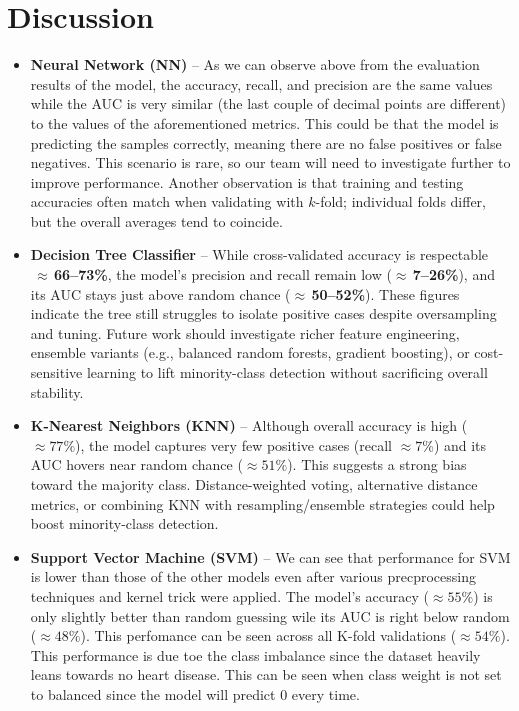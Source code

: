 \documentclass[11pt,a4paper]{article}
\begin{document}
\section{Discussion}
\begin{itemize}
    \item \textbf{Neural Network (NN)} – As we can observe above from the evaluation
          results of the model, the accuracy, recall,
          and precision are the same values while the AUC is very similar
          (the last couple of decimal points are different) to the values
          of the aforementioned metrics. This
          could be that the model is predicting the samples correctly, meaning
          there are no false positives or false negatives. This
          scenario is rare, so our team will need to investigate further to improve performance.
          Another observation is that training and testing accuracies often match when validating with \(k\)-fold;
          individual folds differ, but the overall averages tend to coincide.
    \item \textbf{Decision Tree Classifier} – While cross-validated accuracy is respectable
          $\,\approx$\,\textbf{66--73\%},
          the model’s precision and recall remain low ($\approx$\,\textbf{7--26\%}), and its AUC stays just above random chance
          ($\approx$\,\textbf{50--52\%}). These figures indicate the tree still struggles to isolate positive cases despite oversampling and tuning. Future work should investigate richer feature engineering, ensemble variants (e.g., balanced random forests, gradient boosting), or cost-sensitive learning to lift minority-class detection without sacrificing overall stability.
    \item \textbf{K-Nearest Neighbors (KNN)} – Although overall accuracy is high ($\approx 77\%$), the model captures very few positive cases (recall $\approx 7\%$) and its AUC hovers near random chance ($\approx 51\%$). This suggests a strong bias toward the majority class. Distance-weighted voting, alternative distance metrics, or combining KNN with resampling/ensemble strategies could help boost minority-class detection.
    \item \textbf{Support Vector Machine (SVM)} – We can see that performance for SVM is lower than those of the other models even after various precprocessing techniques and kernel trick were applied. The model's accuracy ($\approx 55\%$) is only slightly better than random guessing wile its AUC is right below random ($\approx 48\%$). This perfomance can be seen across all K-fold validations ($\approx 54\%$). This performance is due toe the class imbalance since the dataset heavily leans towards no heart disease. This can be seen when class weight is not set to balanced since the model will predict 0 every time.
\end{itemize}
\end{document}
